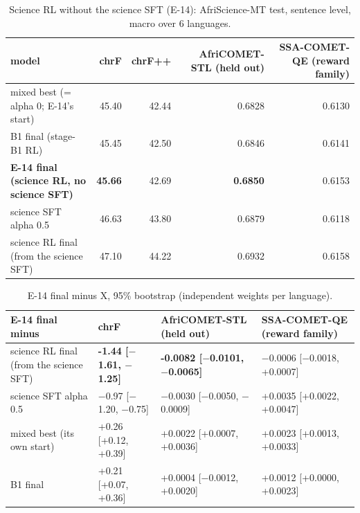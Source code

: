 \begin{table}[t]
\centering\footnotesize
\setlength{\tabcolsep}{4pt}
\caption{Science RL without the science SFT (E-14): AfriScience-MT test, sentence level, macro over 6 languages.}\label{tab:e14a}
\begin{tabularx}{\linewidth}{@{}>{\raggedright\arraybackslash}Xrrrr@{}}
\toprule
model & chrF & chrF++ & AfriCOMET-STL (held out) & SSA-COMET-QE (reward family) \\
\midrule
mixed best (= alpha 0; E-14's start) & 45.40 & 42.44 & 0.6828 & 0.6130 \\
B1 final (stage-B1 RL) & 45.45 & 42.50 & 0.6846 & 0.6141 \\
\textbf{E-14 final (science RL, no science SFT)} & \textbf{45.66} & 42.69 & \textbf{0.6850} & 0.6153 \\
science SFT alpha 0.5 & 46.63 & 43.80 & 0.6879 & 0.6118 \\
science RL final (from the science SFT) & 47.10 & 44.22 & 0.6932 & 0.6158 \\
\bottomrule
\end{tabularx}
\end{table}

\begin{table}[t]
\centering\footnotesize
\setlength{\tabcolsep}{4pt}
\caption{E-14 final minus X, 95\% bootstrap (independent weights per language).}\label{tab:e14b}
\begin{tabularx}{\linewidth}{@{}>{\raggedright\arraybackslash}Xll>{\raggedright\arraybackslash}X@{}}
\toprule
E-14 final minus & chrF & AfriCOMET-STL (held out) & SSA-COMET-QE (reward family) \\
\midrule
science RL final (from the science SFT) & \textbf{-1.44 [\ensuremath{-}1.61, \ensuremath{-}1.25]} & \textbf{-0.0082 [\ensuremath{-}0.0101, \ensuremath{-}0.0065]} & \ensuremath{-}0.0006 [\ensuremath{-}0.0018, +0.0007] \\
science SFT alpha 0.5 & \ensuremath{-}0.97 [\ensuremath{-}1.20, \ensuremath{-}0.75] & \ensuremath{-}0.0030 [\ensuremath{-}0.0050, \ensuremath{-}0.0009] & +0.0035 [+0.0022, +0.0047] \\
mixed best (its own start) & +0.26 [+0.12, +0.39] & +0.0022 [+0.0007, +0.0036] & +0.0023 [+0.0013, +0.0033] \\
B1 final & +0.21 [+0.07, +0.36] & +0.0004 [\ensuremath{-}0.0012, +0.0020] & +0.0012 [+0.0000, +0.0023] \\
\bottomrule
\end{tabularx}
\end{table}

